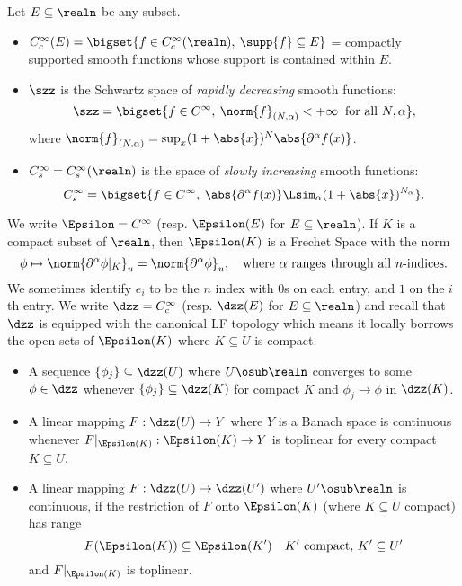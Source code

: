 \documentclass[../main-v2-manifolds.tex]{subfiles}
\begin{document}
Let $E\subseteq \realn$ be any subset.
\begin{itemize}
    \item $C^\infty_c(E)=\bigset{f\in C_c^\infty(\realn),\: \supp{f}\subseteq E}$ = compactly supported smooth functions whose support is contained within $E$.
\end{itemize}
\begin{itemize}
    \item $\szz$ is the Schwartz space of \emph{rapidly decreasing} smooth functions:
        \begin{equation}
        \szz=\bigset{f\in C^\infty,\: \norm{f}_{(N,\alpha)} <+\infty\:\text{ for all }N,\alpha},
        \label{eq:schwartz space}
    \end{equation}
    where $\norm{f}_{(N,\alpha)} = \sup_{x}(1+\abs{x})^{N}\abs{\partial^\alpha f(x)}$.
    \item $C_s^\infty= C_s^\infty(\realn)$ is the space of  \emph{slowly increasing} smooth functions:
        \begin{equation}\label{eq:slowly increasing functions}
        C_s^\infty = \bigset{f\in C^\infty,\: \abs{\partial^\alpha f(x)}\Lsim_\alpha (1+\abs{x})^{N_{\alpha}}}.
    \end{equation}
\end{itemize}
We write $\Epsilon = C^\infty$ (resp. $\Epsilon(E)$ for $E\subseteq\realn$). If $K$ is a compact subset of $\realn$, then $\Epsilon(K)$ is a Frechet Space with the norm
\begin{equation}\label{eq:dzz(K) norm}
    \phi\mapsto \norm{\partial^\alpha\phi\vert_K}_u = \norm{\partial^\alpha\phi}_u,\quad\text{where }\alpha\text{ ranges through all }n\text{-indices}.
\end{equation}
We sometimes identify $e_i$ to be the $n$ index with $0$s on each entry, and $1$ on the $i$th entry.
We write $\dzz = C^\infty_c$ (resp. $\dzz(E)$ for $E\subseteq\realn$) and recall that $\dzz$ is equipped with the canonical LF topology which means it locally borrows the open sets of $\Epsilon(K)$ where $K\subseteq U$ is compact. 
\begin{itemize}
    \item A sequence $\{\phi_j\}\subseteq\dzz(U)$ where $U\osub\realn$ converges to some $\phi\in \dzz$ whenever $\{\phi_j\}\subseteq \dzz(K)$ for compact $K$ and $\phi_j\to \phi$ in $\dzz(K)$.
    \item A linear mapping $F: \dzz(U)\to Y$ where $Y$ is a Banach space is continuous whenever $F\vert_{\Epsilon(K)}: \Epsilon(K)\to Y$ is toplinear for every compact $K\subseteq U$.
    \item A linear mapping $F:\dzz(U)\to \dzz(U')$ where $U'\osub \realn$ is continuous, if the restriction of $F$ onto $\Epsilon(K)$ (where $K\subseteq U$ compact) has range 
    \[
        F(\Epsilon(K))\subseteq\Epsilon(K')\quad K'\text{ compact, } K'\subseteq U'
    \]
    and $F\vert_{\Epsilon(K)}$ is toplinear.
\end{itemize}
\end{document}
